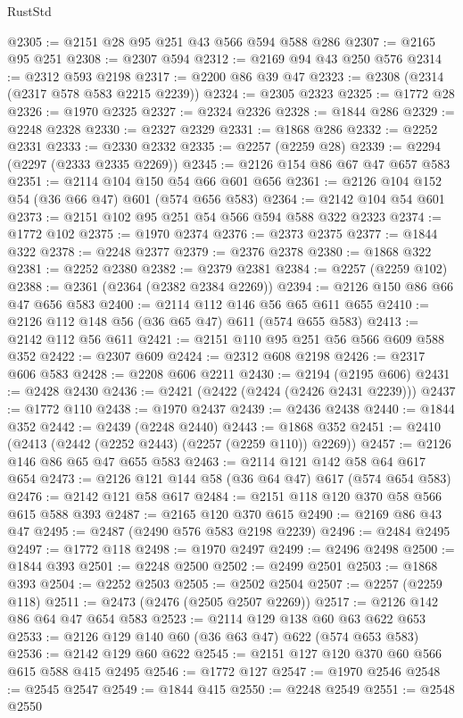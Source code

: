 \begin{lexlean}{RustStd}
\begin{coremodule}
{\begin{coremodule}
{{{{{{{{{{{{{{{@2305 := @2151 @28 @95 @251 @43 @566 @594 @588 @286
@2307 := @2165 @95 @251
@2308 := @2307 @594
@2312 := @2169 @94 @43 @250 @576
@2314 := @2312 @593 @2198
@2317 := @2200 @86 @39 @47
@2323 := @2308 (@2314 (@2317 @578 @583 @2215 @2239))
@2324 := @2305 @2323
@2325 := @1772 @28
@2326 := @1970 @2325
@2327 := @2324 @2326
@2328 := @1844 @286
@2329 := @2248 @2328
@2330 := @2327 @2329
@2331 := @1868 @286
@2332 := @2252 @2331
@2333 := @2330 @2332
@2335 := @2257 (@2259 @28)
@2339 := @2294 (@2297 (@2333 @2335 @2269))
@2345 := @2126 @154 @86 @67 @47 @657 @583
@2351 := @2114 @104 @150 @54 @66 @601 @656
@2361 := @2126 @104 @152 @54 (@36 @66 @47) @601 (@574 @656 @583)
@2364 := @2142 @104 @54 @601
@2373 := @2151 @102 @95 @251 @54 @566 @594 @588 @322 @2323
@2374 := @1772 @102
@2375 := @1970 @2374
@2376 := @2373 @2375
@2377 := @1844 @322
@2378 := @2248 @2377
@2379 := @2376 @2378
@2380 := @1868 @322
@2381 := @2252 @2380
@2382 := @2379 @2381
@2384 := @2257 (@2259 @102)
@2388 := @2361 (@2364 (@2382 @2384 @2269))
@2394 := @2126 @150 @86 @66 @47 @656 @583
@2400 := @2114 @112 @146 @56 @65 @611 @655
@2410 := @2126 @112 @148 @56 (@36 @65 @47) @611 (@574 @655 @583)
@2413 := @2142 @112 @56 @611
@2421 := @2151 @110 @95 @251 @56 @566 @609 @588 @352
@2422 := @2307 @609
@2424 := @2312 @608 @2198
@2426 := @2317 @606 @583
@2428 := @2208 @606 @2211
@2430 := @2194 (@2195 @606)
@2431 := @2428 @2430
@2436 := @2421 (@2422 (@2424 (@2426 @2431 @2239)))
@2437 := @1772 @110
@2438 := @1970 @2437
@2439 := @2436 @2438
@2440 := @1844 @352
@2442 := @2439 (@2248 @2440)
@2443 := @1868 @352
@2451 := @2410 (@2413 (@2442 (@2252 @2443) (@2257 (@2259 @110)) @2269))
@2457 := @2126 @146 @86 @65 @47 @655 @583
@2463 := @2114 @121 @142 @58 @64 @617 @654
@2473 := @2126 @121 @144 @58 (@36 @64 @47) @617 (@574 @654 @583)
@2476 := @2142 @121 @58 @617
@2484 := @2151 @118 @120 @370 @58 @566 @615 @588 @393
@2487 := @2165 @120 @370 @615
@2490 := @2169 @86 @43 @47
@2495 := @2487 (@2490 @576 @583 @2198 @2239)
@2496 := @2484 @2495
@2497 := @1772 @118
@2498 := @1970 @2497
@2499 := @2496 @2498
@2500 := @1844 @393
@2501 := @2248 @2500
@2502 := @2499 @2501
@2503 := @1868 @393
@2504 := @2252 @2503
@2505 := @2502 @2504
@2507 := @2257 (@2259 @118)
@2511 := @2473 (@2476 (@2505 @2507 @2269))
@2517 := @2126 @142 @86 @64 @47 @654 @583
@2523 := @2114 @129 @138 @60 @63 @622 @653
@2533 := @2126 @129 @140 @60 (@36 @63 @47) @622 (@574 @653 @583)
@2536 := @2142 @129 @60 @622
@2545 := @2151 @127 @120 @370 @60 @566 @615 @588 @415 @2495
@2546 := @1772 @127
@2547 := @1970 @2546
@2548 := @2545 @2547
@2549 := @1844 @415
@2550 := @2248 @2549
@2551 := @2548 @2550
}}}}}}}}}}}}}}}
\end{coremodule}}
\end{coremodule}
\end{lexlean}
